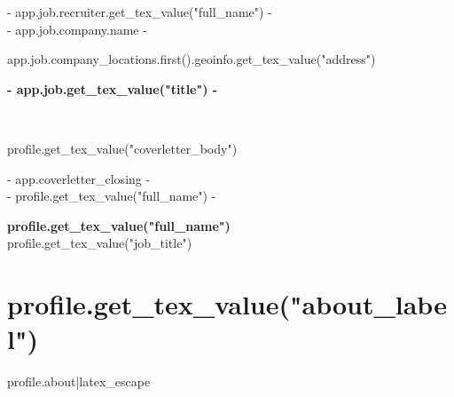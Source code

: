 \documentclass[a4paper, {{- app.cv.latex_pt -}}pt]{report}
\begin{document}
\vspace{10mm}
{{- app.job.recruiter.get_tex_value("full_name") -}} \\
{{- app.job.company.name -}} \\
{%
{{ app.job.company_locations.first().geoinfo.get_tex_value("address") }}
{%

\begin{center}
\textbf{ {{- app.job.get_tex_value("title") -}} }\\
\vspace{15mm}
\end{center}

\\

\vspace{-3mm}\setlength\parindent{24pt}

{{ profile.get_tex_value("coverletter_body") }}

\vspace{5mm}

\vspace{10mm}

\begin{flushleft}
{{- app.coverletter_closing -}}\\
{{- profile.get_tex_value("full_name") -}}\\
\vspace{3mm}

\end{flushleft}

\pagebreak

\begin{center}
  \textbf{\Huge {{ profile.get_tex_value("full_name") }}} \\
  \vspace{2mm}
   {{ profile.get_tex_value("job_title") }}
\end{center}

\vspace{4mm}

{%
\space
\section*{ {{ profile.get_tex_value("about_label") }} }
{{ profile.about|latex_escape }}
{%

}}}}
\end{document}
